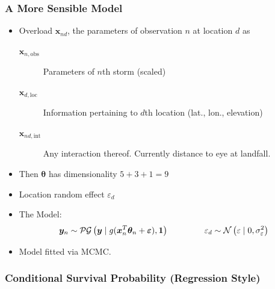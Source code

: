 \documentclass[aspectratio=169,10pt]{beamer}
\begin{document}
\begin{frame}
    \frametitle{A More Sensible Model}
    \begin{itemize}
        \item Overload $\bm{x}_{nd}$, the parameters of observation $n$ at location $d$ as
        \begin{description}
            \item[$\bm{x}_{n,\text{obs}}$] Parameters of $n$th storm (scaled)
            \item[$\bm{x}_{d,\text{loc}}$] Information pertaining to $d$th location 
                (lat., lon., elevation)
            \item[$\bm{x}_{nd,\text{int}}$] Any interaction thereof.  
                Currently distance to eye at landfall.
        \end{description}
        \item Then $\bm{\theta}$ has dimensionality $5 + 3 + 1 = 9$
        \item Location random effect $\varepsilon_d$
        \item The Model:
        \[
            \bm{y}_n \sim \mathcal{PG}\left(\bm{y}\mid g(\bm{x}_n^T\bm{\theta}_n 
                + \bm{\varepsilon}), \bm{1}\right)
            \hspace{1.5cm}
            \varepsilon_d \sim \mathcal{N}\left(\varepsilon\mid 0, 
                \sigma_{\varepsilon}^2\right)
        \]
        \item Model fitted via MCMC.
    \end{itemize}
\end{frame} %

\subsubsection{Conditional Survival Probability (Regression Style)}
\end{document}
